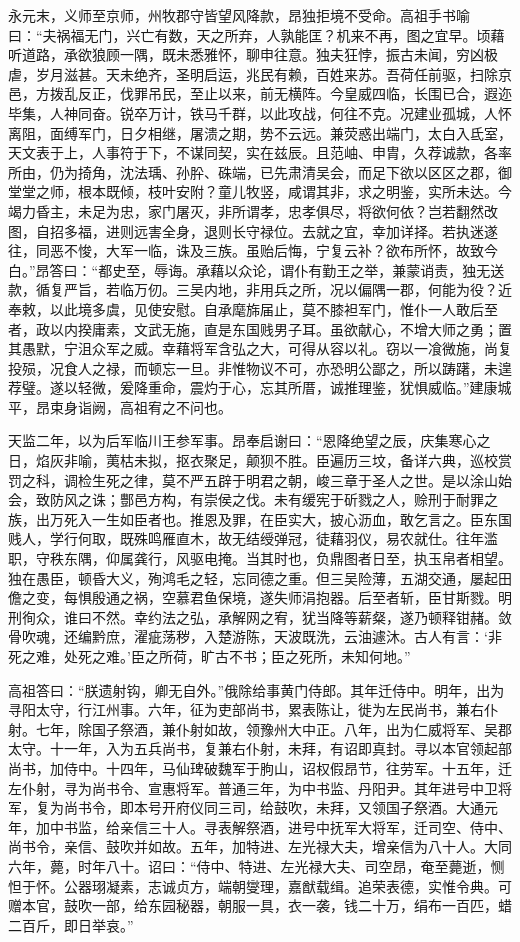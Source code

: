 \documentclass[12pt,UTF8]{ctexbook}
\begin{document}
永元末，义师至京师，州牧郡守皆望风降款，昂独拒境不受命。高祖手书喻曰：“夫祸福无门，兴亡有数，天之所弃，人孰能匡？机来不再，图之宜早。顷藉听道路，承欲狼顾一隅，既未悉雅怀，聊申往意。独夫狂悖，振古未闻，穷凶极虐，岁月滋甚。天未绝齐，圣明启运，兆民有赖，百姓来苏。吾荷任前驱，扫除京邑，方拨乱反正，伐罪吊民，至止以来，前无横阵。今皇威四临，长围已合，遐迩毕集，人神同奋。锐卒万计，铁马千群，以此攻战，何往不克。况建业孤城，人怀离阻，面缚军门，日夕相继，屠溃之期，势不云远。兼荧惑出端门，太白入氐室，天文表于上，人事符于下，不谋同契，实在兹辰。且范岫、申胄，久荐诚款，各率所由，仍为掎角，沈法瑀、孙肸、硃端，已先肃清吴会，而足下欲以区区之郡，御堂堂之师，根本既倾，枝叶安附？童儿牧竖，咸谓其非，求之明鉴，实所未达。今竭力昏主，未足为忠，家门屠灭，非所谓孝，忠孝俱尽，将欲何依？岂若翻然改图，自招多福，进则远害全身，退则长守禄位。去就之宜，幸加详择。若执迷遂往，同恶不悛，大军一临，诛及三族。虽贻后悔，宁复云补？欲布所怀，故致今白。”昂答曰：“都史至，辱诲。承藉以众论，谓仆有勤王之举，兼蒙诮责，独无送款，循复严旨，若临万仞。三吴内地，非用兵之所，况以偏隅一郡，何能为役？近奉敕，以此境多虞，见使安慰。自承麾旆届止，莫不膝袒军门，惟仆一人敢后至者，政以内揆庸素，文武无施，直是东国贱男子耳。虽欲献心，不增大师之勇；置其愚默，宁沮众军之威。幸藉将军含弘之大，可得从容以礼。窃以一飡微施，尚复投殒，况食人之禄，而顿忘一旦。非惟物议不可，亦恐明公鄙之，所以踌躇，未遑荐璧。遂以轻微，爰降重命，震灼于心，忘其所厝，诚推理鉴，犹惧威临。”建康城平，昂束身诣阙，高祖宥之不问也。

天监二年，以为后军临川王参军事。昂奉启谢曰：“恩降绝望之辰，庆集寒心之日，焰灰非喻，荑枯未拟，抠衣聚足，颠狈不胜。臣遍历三坟，备详六典，巡校赏罚之科，调检生死之律，莫不严五辟于明君之朝，峻三章于圣人之世。是以涂山始会，致防风之诛；酆邑方构，有崇侯之伐。未有缓宪于斫戮之人，赊刑于耐罪之族，出万死入一生如臣者也。推恩及罪，在臣实大，披心沥血，敢乞言之。臣东国贱人，学行何取，既殊鸣雁直木，故无结绶弹冠，徒藉羽仪，易农就仕。往年滥职，守秩东隅，仰属龚行，风驱电掩。当其时也，负鼎图者日至，执玉帛者相望。独在愚臣，顿昏大义，殉鸿毛之轻，忘同德之重。但三吴险薄，五湖交通，屡起田儋之变，每惧殷通之祸，空慕君鱼保境，遂失师涓抱器。后至者斩，臣甘斯戮。明刑徇众，谁曰不然。幸约法之弘，承解网之宥，犹当降等薪粲，遂乃顿释钳赭。敛骨吹魂，还编黔庶，濯疵荡秽，入楚游陈，天波既洗，云油遽沐。古人有言：‘非死之难，处死之难。’臣之所荷，旷古不书；臣之死所，未知何地。”

高祖答曰：“朕遗射钩，卿无自外。”俄除给事黄门侍郎。其年迁侍中。明年，出为寻阳太守，行江州事。六年，征为吏部尚书，累表陈让，徙为左民尚书，兼右仆射。七年，除国子祭酒，兼仆射如故，领豫州大中正。八年，出为仁威将军、吴郡太守。十一年，入为五兵尚书，复兼右仆射，未拜，有诏即真封。寻以本官领起部尚书，加侍中。十四年，马仙琕破魏军于朐山，诏权假昂节，往劳军。十五年，迁左仆射，寻为尚书令、宣惠将军。普通三年，为中书监、丹阳尹。其年进号中卫将军，复为尚书令，即本号开府仪同三司，给鼓吹，未拜，又领国子祭酒。大通元年，加中书监，给亲信三十人。寻表解祭酒，进号中抚军大将军，迁司空、侍中、尚书令，亲信、鼓吹并如故。五年，加特进、左光禄大夫，增亲信为八十人。大同六年，薨，时年八十。诏曰：“侍中、特进、左光禄大夫、司空昂，奄至薨逝，恻怛于怀。公器珝凝素，志诚贞方，端朝燮理，嘉猷载缉。追荣表德，实惟令典。可赠本官，鼓吹一部，给东园秘器，朝服一具，衣一袭，钱二十万，绢布一百匹，蜡二百斤，即日举哀。”
\end{document}
